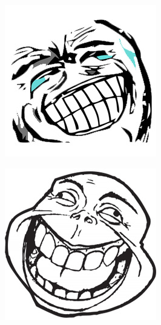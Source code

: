 \begin{multicols}{8}
\begin{center}

\includegraphics[width=\linewidth]{./IMG-GIT/MEMES/Meme-Faces-31.jpg}  
\end{center}

\begin{center}
\includegraphics[width=\linewidth]{./IMG-GIT/MEMES/Meme-Faces-40.jpg}  
\end{center}


\end{multicols}
